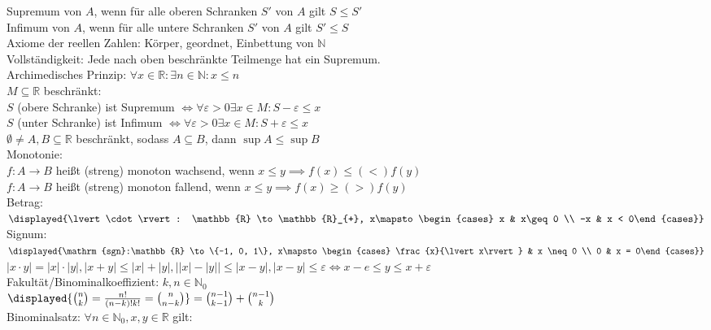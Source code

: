 \documentclass[9pt, landscape,a4paper]{extarticle}
\newcommand*\abs[1]{\lvert#1\rvert}
\newcommand\eps{\varepsilon}
\newcommand\sgn{\mathrm{sgn}}
\begin{document}
\begin{multicols*}{4}
  Supremum von $A$, wenn für alle oberen Schranken $S'$ von $A$ gilt $S\leq S'$ \\
  Infimum von $A$, wenn für alle untere Schranken $S'$ von $A$ gilt $S'\leq S$ \\
  Axiome der reellen Zahlen: Körper, geordnet, Einbettung von $\mathbb{N}$ \\
  Vollständigkeit: Jede nach oben beschränkte Teilmenge hat ein Supremum. \\
  Archimedisches Prinzip: $\forall x\in \mathbb{R}: \exists n\in \mathbb{N}: x\leq n$ \\
  $M\subseteq \mathbb{R}$ beschränkt: \\
  $S$ (obere Schranke) ist Supremum $\iff \forall \eps > 0 \exists x\in M: S - \eps \leq x$ \\
  $S$ (unter Schranke) ist Infimum $\iff \forall \eps > 0 \exists x\in M: S + \eps \leq x$ \\
  $\emptyset \neq A, B \subseteq \mathbb{R}$ beschränkt, sodass $A\subseteq B$, dann $\sup A \leq \sup B$ \\
  Monotonie: \\
  $f: A\to B$ heißt (streng) monoton wachsend, wenn $x\leq y \implies f(x) \leq (<) f(y)$ \\
  $f: A\to B$ heißt (streng) monoton fallend, wenn $x\leq y \implies f(x) \geq (>) f(y)$ \\
  Betrag: $\displayed{\abs{\cdot}: \mathbb{R} \to \mathbb{R}_{+}, x\mapsto \begin{cases} x & x\geq 0 \\ -x & x < 0\end{cases}}$ \\
  Signum: $\displayed{\sgn:\mathbb{R} \to \{-1, 0, 1\}, x\mapsto \begin{cases} \frac{x}{\abs{x}} & x \neq 0 \\ 0 & x = 0\end{cases}}$ \\
  $\abs{x \cdot y} = \abs{x}\cdot \abs{y}, \abs{x + y} \leq \abs{x} + \abs{y}, \abs{\abs{x} - \abs{y}} \leq \abs{x - y}, \abs{x - y} \leq \eps \iff x - e \leq y \leq x + \eps$ \\
  Fakultät/Binominalkoeffizient: $k, n\in \mathbb{N}_0$ \\
  $\displayed{\binom{n}{k} = \frac{n!}{(n - k)! k!} = \binom{n}{n - k}} = \binom{n - 1}{k - 1} + \binom{n - 1}{k}$ \\
  Binominalsatz: $\forall n\in\mathbb{N}_0, x, y\in\mathbb{R}$ gilt: \\

\end{multicols*}
\end{document}
